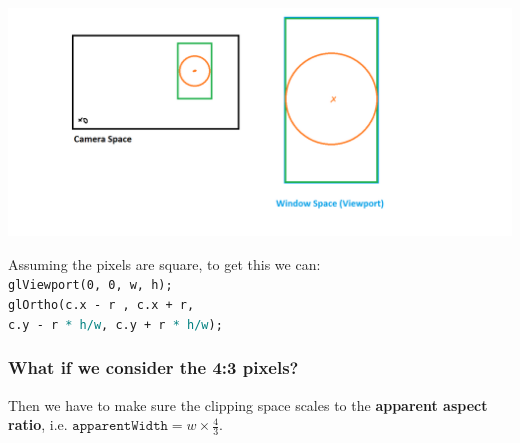 \documentclass{beamer}
\begin{document}
\begin{frame}
    \frametitle{}

    \begin{center}
        \includegraphics[scale=0.4]{q7-cam-win-3.png}
    \end{center}

    \begin{tcolorbox}
        \small
        Assuming the pixels are square, to get this we can:\\
        \texttt{glViewport(0, 0, w, h);}\\
        \texttt{glOrtho(c.x - r , c.x + r, \\
        c.y - r \textcolor{teal}{* h/w}, c.y + r \textcolor{teal}{* h/w});}
    \end{tcolorbox}

\end{frame}

\begin{frame}
    \frametitle{What if we consider the 4:3 pixels?}

    Then we have to make sure the clipping space scales to the 
    \textbf{apparent aspect ratio}, i.e. $\texttt{apparentWidth} = w \times \frac{4}{3}$.

\end{frame}
\end{document}
